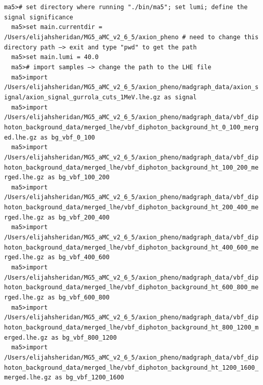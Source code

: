 \documentclass[a4paper, 10pt]{article}
\begin{document}
\texttt{ma5>\# set directory where running "./\-bin/\-ma5"; set lumi; define the signal significance\\
}
\texttt{ }\texttt{ }\texttt{ma5>set main.currentdir = /\-Users/\-elijahsheridan/\-MG5\_aMC\_v2\_6\_5/\-axion\_pheno \# need to change this directory path --> exit and type "pwd" to get the path\\
}
\texttt{ }\texttt{ }\texttt{ma5>set main.lumi = 40.0\\
}
\texttt{ }\texttt{ }\texttt{ma5>\# import samples --> change the path to the LHE file\\
}
\texttt{ }\texttt{ }\texttt{ma5>import /\-Users/\-elijahsheridan/\-MG5\_aMC\_v2\_6\_5/\-axion\_pheno/\-madgraph\_data/\-axion\_signal/\-axion\_signal\_gurrola\_cuts\_1MeV.lhe.gz as signal\\
}
\texttt{ }\texttt{ }\texttt{ma5>import /\-Users/\-elijahsheridan/\-MG5\_aMC\_v2\_6\_5/\-axion\_pheno/\-madgraph\_data/\-vbf\_diphoton\_background\_data/\-merged\_lhe/\-vbf\_diphoton\_background\_ht\_0\_100\_merged.lhe.gz as bg\_vbf\_0\_100\\
}
\texttt{ }\texttt{ }\texttt{ma5>import /\-Users/\-elijahsheridan/\-MG5\_aMC\_v2\_6\_5/\-axion\_pheno/\-madgraph\_data/\-vbf\_diphoton\_background\_data/\-merged\_lhe/\-vbf\_diphoton\_background\_ht\_100\_200\_merged.lhe.gz as bg\_vbf\_100\_200\\
}
\texttt{ }\texttt{ }\texttt{ma5>import /\-Users/\-elijahsheridan/\-MG5\_aMC\_v2\_6\_5/\-axion\_pheno/\-madgraph\_data/\-vbf\_diphoton\_background\_data/\-merged\_lhe/\-vbf\_diphoton\_background\_ht\_200\_400\_merged.lhe.gz as bg\_vbf\_200\_400\\
}
\texttt{ }\texttt{ }\texttt{ma5>import /\-Users/\-elijahsheridan/\-MG5\_aMC\_v2\_6\_5/\-axion\_pheno/\-madgraph\_data/\-vbf\_diphoton\_background\_data/\-merged\_lhe/\-vbf\_diphoton\_background\_ht\_400\_600\_merged.lhe.gz as bg\_vbf\_400\_600\\
}
\texttt{ }\texttt{ }\texttt{ma5>import /\-Users/\-elijahsheridan/\-MG5\_aMC\_v2\_6\_5/\-axion\_pheno/\-madgraph\_data/\-vbf\_diphoton\_background\_data/\-merged\_lhe/\-vbf\_diphoton\_background\_ht\_600\_800\_merged.lhe.gz as bg\_vbf\_600\_800\\
}
\texttt{ }\texttt{ }\texttt{ma5>import /\-Users/\-elijahsheridan/\-MG5\_aMC\_v2\_6\_5/\-axion\_pheno/\-madgraph\_data/\-vbf\_diphoton\_background\_data/\-merged\_lhe/\-vbf\_diphoton\_background\_ht\_800\_1200\_merged.lhe.gz as bg\_vbf\_800\_1200\\
}
\texttt{ }\texttt{ }\texttt{ma5>import /\-Users/\-elijahsheridan/\-MG5\_aMC\_v2\_6\_5/\-axion\_pheno/\-madgraph\_data/\-vbf\_diphoton\_background\_data/\-merged\_lhe/\-vbf\_diphoton\_background\_ht\_1200\_1600\_merged.lhe.gz as bg\_vbf\_1200\_1600\\
}
\end{document}
